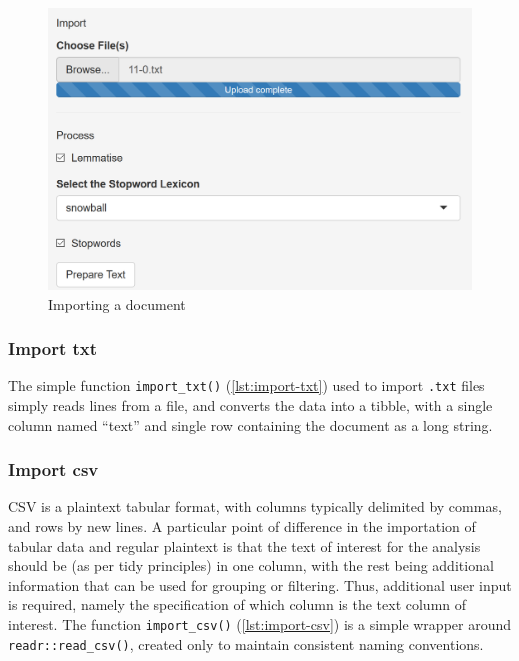 \message{ !name(jason-cairns-dissertation.tex)}\documentclass[11pt, a4paper, titlepage]{report}
\begin{document}
\begin{figure}
\centering
\includegraphics[scale=0.7]{processing-import-process.png}
\caption{Importing a document\label{fig:processing-import-pro}}
\end{figure}

\subsubsection{Import txt}

The simple function \texttt{import_txt()}
(\cref{lst:import-txt}) used to import \texttt{.txt} files simply
reads lines from a file, and converts the data into a
tibble\autocite{muller19tib}, with a single column named ``text'' and
single row containing the document as a long string.

\subsubsection{Import csv}

CSV is a plaintext tabular format, with columns typically delimited by
commas, and rows by new lines. A particular point of difference in the
importation of tabular data and regular plaintext is that the text of
interest for the analysis should be (as per tidy principles) in one
column, with the rest being additional information that can be used
for grouping or filtering. Thus, additional user input is required,
namely the specification of which column is the text column of
interest. The function \texttt{import_csv()}
(\cref{lst:import-csv}) is a simple wrapper around
\texttt{readr::read_csv()}\autocite{wickham18red}, created only
to maintain consistent naming conventions.
\end{document}
